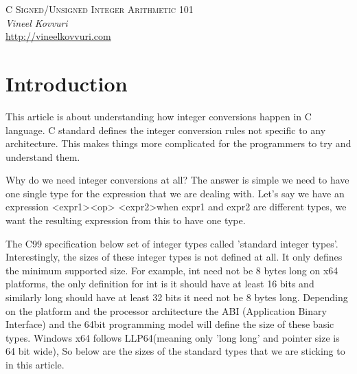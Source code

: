 \documentclass{article}
\begin{document}
\begin{titlepage}
   \begin{center}
      \Large\textsc{C Signed/Unsigned Integer Arithmetic 101}\\
      \vspace{5mm}
      \Large\textit{Vineel Kovvuri}\\
      \url{http://vineelkovvuri.com}\\
   \end{center}
\end{titlepage}

\tableofcontents

\newpage
\section{Introduction}
This article is about understanding how integer conversions happen in C
language. C standard defines the integer conversion rules not specific to any
architecture. This makes things more complicated for the programmers to try and
understand them.

Why do we need integer conversions at all? The answer is simple we need to have
one single type for the expression that we are dealing with. Let's say we have
an expression \textless expr1\textgreater \textless op\textgreater
\textless expr2\textgreater  when expr1 and expr2 are different types, we
want the resulting expression from this to have one type.

The C99 specification below set of integer types called 'standard integer
types'. Interestingly, the sizes of these integer types is not defined at all.
It only defines the minimum supported size. For example, int need not be 8 bytes
long on x64 platforms, the only definition for int is it should have at least 16
bits and similarly long should have at least 32 bits it need not be 8 bytes
long. Depending on the platform and the processor architecture the ABI
(Application Binary Interface) and the 64bit programming model will define the
size of these basic types. Windows x64 follows LLP64(meaning only 'long long'
and pointer size is 64 bit wide), So below are the sizes of the standard types
that we are sticking to in this article.
\end{document}
